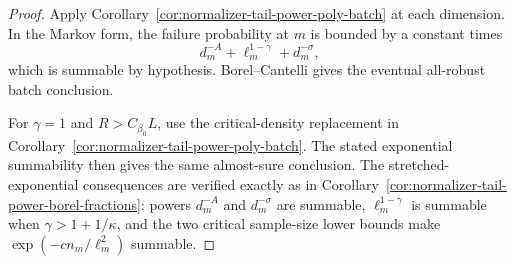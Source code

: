 \documentclass[11pt]{amsart}
\numberwithin{equation}{section}
\theoremstyle{definition}
\theoremstyle{remark}
\begin{document}
\begin{proof}
Apply Corollary~\ref{cor:normalizer-tail-power-poly-batch} at each dimension.
In the Markov form, the failure probability at \(m\) is bounded by a constant
times
\[
  d_m^{-A}+\ell_m^{1-\gamma}+d_m^{-\sigma},
\]
which is summable by hypothesis.  Borel--Cantelli gives the eventual all-robust
batch conclusion.

For \(\gamma=1\) and \(R>C_{\beta_0}L\), use the critical-density replacement in
Corollary~\ref{cor:normalizer-tail-power-poly-batch}.  The stated exponential
summability then gives the same almost-sure conclusion.  The
stretched-exponential consequences are verified exactly as in
Corollary~\ref{cor:normalizer-tail-power-borel-fractions}: powers
\(d_m^{-A}\) and \(d_m^{-\sigma}\) are summable, \(\ell_m^{1-\gamma}\) is
summable when \(\gamma>1+1/\kappa\), and the two critical sample-size lower
bounds make \(\exp(-c n_m/\ell_m^2)\) summable.
\end{proof}
\end{document}

